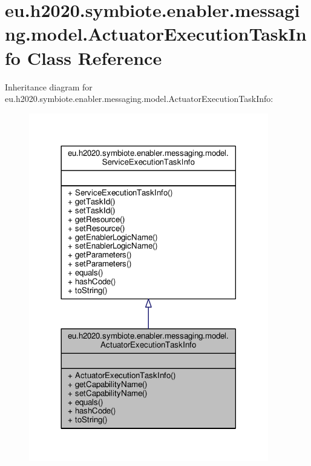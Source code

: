 \hypertarget{classeu_1_1h2020_1_1symbiote_1_1enabler_1_1messaging_1_1model_1_1ActuatorExecutionTaskInfo}{}\section{eu.\+h2020.\+symbiote.\+enabler.\+messaging.\+model.\+Actuator\+Execution\+Task\+Info Class Reference}
\label{classeu_1_1h2020_1_1symbiote_1_1enabler_1_1messaging_1_1model_1_1ActuatorExecutionTaskInfo}


Inheritance diagram for eu.\+h2020.\+symbiote.\+enabler.\+messaging.\+model.\+Actuator\+Execution\+Task\+Info\+:
\nopagebreak
\begin{figure}[H]
\begin{center}
\leavevmode
\includegraphics[width=296pt]{classeu_1_1h2020_1_1symbiote_1_1enabler_1_1messaging_1_1model_1_1ActuatorExecutionTaskInfo__inherit__graph}
\end{center}
\end{figure}


